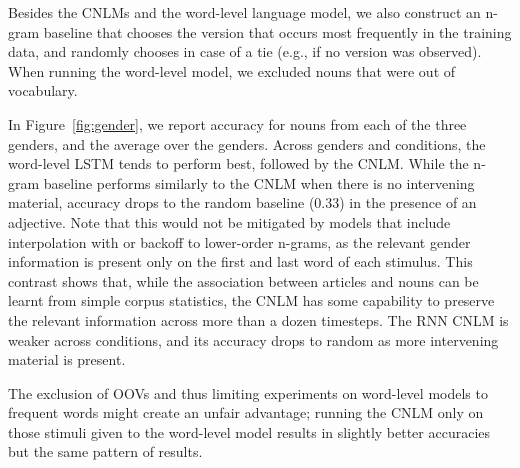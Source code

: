 Besides the CNLMs and the word-level language model, we also construct an n-gram baseline that chooses the version that occurs most frequently in the training data, and randomly chooses in case of a tie (e.g., if no version was observed).
When running the word-level model, we excluded nouns that were out of vocabulary.

In Figure~\ref{fig:gender}, we report accuracy for nouns from each of the three genders, and the average over the genders.
Across genders and conditions, the word-level LSTM tends to perform best, followed by the CNLM.
While the n-gram baseline performs similarly to the CNLM when there is no intervening material, accuracy drops to the random baseline (0.33) in the presence of an adjective.
Note that this would not be mitigated by models that include interpolation with or backoff to lower-order n-grams, as the relevant gender information is present only on the first and last word of each stimulus.
This contrast shows that, while the association between articles and nouns can be learnt from simple corpus statistics, the CNLM has some capability to preserve the relevant information across more than a dozen timesteps.
The RNN CNLM is weaker across conditions, and its accuracy drops to random as more intervening material is present.

The exclusion of OOVs and thus limiting experiments on word-level models to frequent words might create an unfair advantage; running the CNLM only on those stimuli given to the word-level model results in slightly better accuracies but the same pattern of results.


